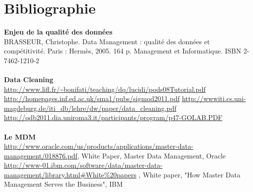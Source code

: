 \section{Bibliographie}
\paragraph*{}
\textbf{Enjeu de la qualité des données}\\
BRASSEUR, Christophe. Data Management : qualité des données et compétitivité. Paris : Hermès, 2005. 164 p. Management et Informatique. ISBN 2-7462-1210-2
\paragraph*{}
\textbf{Data Cleaning}\\
\url {http://www.lifl.fr/~bonifati/teaching/dq/lucidi/pods08Tutorial.pdf}
\url {http://homepages.inf.ed.ac.uk/sma1/pubs/sigmod2011.pdf}
\url {http://wwwiti.cs.uni-magdeburg.de/iti_db/lehre/dw/paper/data_cleaning.pdf}
\url {http://qdb2011.dia.uniroma3.it/participants/program/p47-GOLAB.PDF}
\paragraph*{}
\textbf{Le MDM}\\
\url {http://www.oracle.com/us/products/applications/master-data-management/018876.pdf}, White Paper, Master Data Management, Oracle\\
\url {http://www-01.ibm.com/software/data/master-data-management/library.html#White\%20papers} ,  White paper, "How Master Data Management Serves the Business", IBM \\
